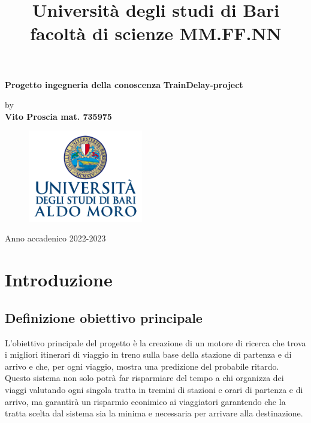 \documentclass[italian,12pt,a4paper]{article}
\title{Università degli studi di Bari facoltà di scienze MM.FF.NN}
\date{} %
\begin{document}
	\maketitle
	\thispagestyle{empty}
	\begin{center}
		\huge	\textbf{Progetto ingegneria della conoscenza}
		\linebreak
		\linebreak
		\Large \textbf{TrainDelay-project}
	\end{center}
	
	
	
	\begin{center}
		by \\
		\Large \textbf{Vito Proscia mat. 735975}
	\end{center}

	
	\begin{figure}[hb]
		\centering
		\includegraphics[width=5cm]{image.png}
	\end{figure}
	
	\vfill
	\begin{center}
		Anno accadenico 2022-2023
	\end{center}
	
	\newpage
	
	\tableofcontents

	\newpage

	
	\section{Introduzione}
	
	\subsection{Definizione obiettivo principale}
	
	L'obiettivo principale del progetto è la creazione di un motore di ricerca che trova i migliori itinerari di viaggio in treno sulla base della stazione di partenza e di arrivo e che, per ogni viaggio, mostra una predizione del probabile ritardo.\\
	Questo sistema non solo potrà far risparmiare del tempo a chi organizza dei viaggi valutando ogni singola tratta in tremini di stazioni e orari di partenza e di arrivo, ma garantirà un risparmio econimico ai viaggiatori garantendo che la tratta scelta dal sistema sia la minima e necessaria per arrivare alla destinazione. 
	
\end{document}
